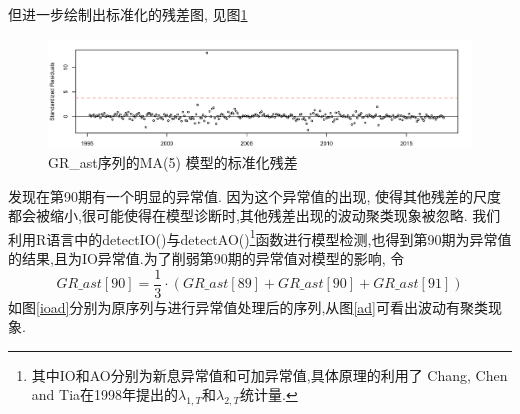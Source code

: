 但进一步绘制出标准化的残差图, 见图\ref{fig:srgrast}
\begin{figure}
	\centering
	\includegraphics[width=0.8\linewidth]{pic/ast/srgr_ast}
	\caption{GR\_ast序列的MA(5) 模型的标准化残差}
	\label{fig:srgrast}
\end{figure}
发现在第90期有一个明显的异常值. 因为这个异常值的出现, 使得其他残差的尺度都会被缩小,很可能使得在模型诊断时,其他残差出现的波动聚类现象被忽略. 我们利用R语言中的detectIO()与detectAO()\footnote{其中IO和AO分别为新息异常值和可加异常值,具体原理的利用了 Chang, Chen and Tia在1998年提出的$\lambda_{1,T}$和$\lambda_{2,T}$统计量.}函数进行模型检测,也得到第90期为异常值的结果,且为IO异常值.为了削弱第90期的异常值对模型的影响, 令
\begin{equation}
GR\_ast[90] = \frac{1}{3} \cdot (GR\_ast[89]+GR\_ast[90]+GR\_ast[91])
\end{equation}
如图\ref{ioad}分别为原序列与进行异常值处理后的序列,从图\ref{ad}可看出波动有聚类现象.
